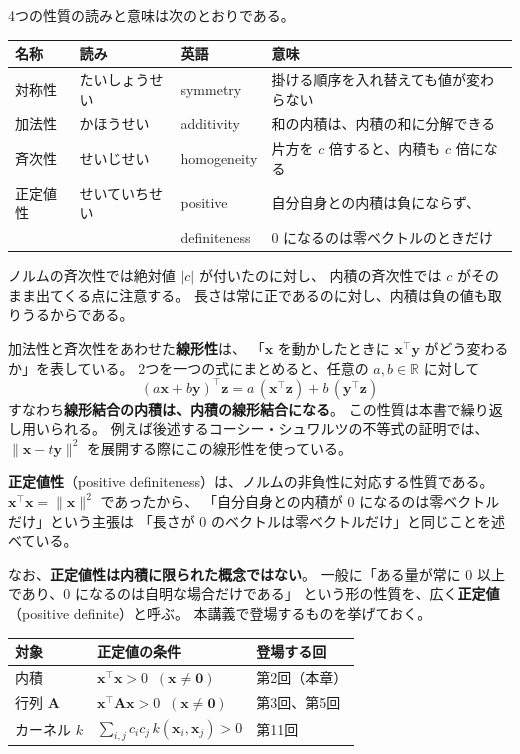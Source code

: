 4つの性質の読みと意味は次のとおりである。

\begin{center}
\begin{tabular}{l|l|l|p{5.6cm}}
\hline
名称 & 読み & 英語 & 意味 \\
\hline\hline
対称性 & たいしょうせい & symmetry & 掛ける順序を入れ替えても値が変わらない \\
加法性 & かほうせい & additivity & 和の内積は、内積の和に分解できる \\
斉次性 & せいじせい & homogeneity & 片方を $c$ 倍すると、内積も $c$ 倍になる \\
正定値性 & せいていちせい & positive & 自分自身との内積は負にならず、 \\
 & & definiteness & $0$ になるのは零ベクトルのときだけ \\
\hline
\end{tabular}
\end{center}

ノルムの斉次性では絶対値 $|c|$ が付いたのに対し、
内積の斉次性では $c$ がそのまま出てくる点に注意する。
長さは常に正であるのに対し、内積は負の値も取りうるからである。

加法性と斉次性をあわせた\textbf{線形性}は、
「$\bm{x}$ を動かしたときに $\bm{x}^\top \bm{y}$ がどう変わるか」を表している。
2つを一つの式にまとめると、任意の $a, b \in \mathbb{R}$ に対して
\begin{equation}
  (a\bm{x} + b\bm{y})^\top \bm{z} = a\,(\bm{x}^\top \bm{z}) + b\,(\bm{y}^\top \bm{z})
\end{equation}
すなわち\textbf{線形結合の内積は、内積の線形結合になる}。
この性質は本書で繰り返し用いられる。
例えば後述するコーシー・シュワルツの不等式の証明では、
$\|\bm{x} - t\bm{y}\|^2$ を展開する際にこの線形性を使っている。

\textbf{正定値性}（positive definiteness）は、ノルムの非負性に対応する性質である。
$\bm{x}^\top \bm{x} = \|\bm{x}\|^2$ であったから、
「自分自身との内積が $0$ になるのは零ベクトルだけ」という主張は
「長さが $0$ のベクトルは零ベクトルだけ」と同じことを述べている。

なお、\textbf{正定値性は内積に限られた概念ではない}。
一般に「ある量が常に $0$ 以上であり、$0$ になるのは自明な場合だけである」
という形の性質を、広く\textbf{正定値}（positive definite）と呼ぶ。
本講義で登場するものを挙げておく。

\begin{center}
\begin{tabular}{l|l|l}
\hline
対象 & 正定値の条件 & 登場する回 \\
\hline\hline
内積 & $\bm{x}^\top \bm{x} > 0 \;\; (\bm{x} \neq \bm{0})$ & 第2回（本章） \\
行列 $\bm{A}$ & $\bm{x}^\top \bm{A} \bm{x} > 0 \;\; (\bm{x} \neq \bm{0})$ & 第3回、第5回 \\
カーネル $k$ & $\sum_{i,j} c_i c_j\, k(\bm{x}_i, \bm{x}_j) > 0$ & 第11回 \\
\hline
\end{tabular}
\end{center}


